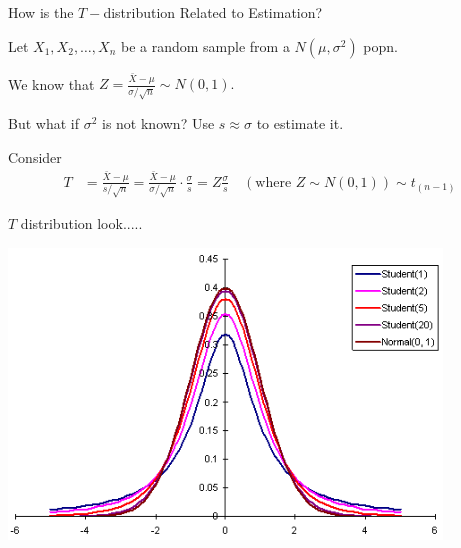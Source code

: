\documentclass{beamer}\usepackage[]{graphicx}\usepackage[]{color}
\begin{document}
\begin{frame}{How is the $T-$distribution Related to Estimation?}

Let $X_1,X_2,\ldots,X_n$ be a random sample
from a $N(\mu,\sigma^2)$ popn.
\medskip

We know that $\displaystyle Z=\frac{\bar{X}-\mu}{\sigma/\sqrt{n}}\sim N(0,1).$ \pause
\medskip

But what if $\sigma^2$ is not known? \pause
Use $s\approx\sigma$ to estimate it.
\bigskip

Consider
\begin{align*}
T &= \frac{\bar{X}-\mu}{s/\sqrt{n}}
= \frac{\bar{X}-\mu}{\sigma/\sqrt{n}} \cdot \frac{\sigma}{s}
= Z \frac{\sigma}{s} \quad
 (\mbox{where\ } Z\sim N(0,1) )
\sim t_{(n-1)}
\end{align*}
\pause

\end{frame}

\begin{frame}{$T$ distribution look.....}

\begin{center}
\includegraphics[width=11.5cm,height=5.3 cm]{T-distribution-2.png}
\end{center}

\end{frame}
\end{document}
